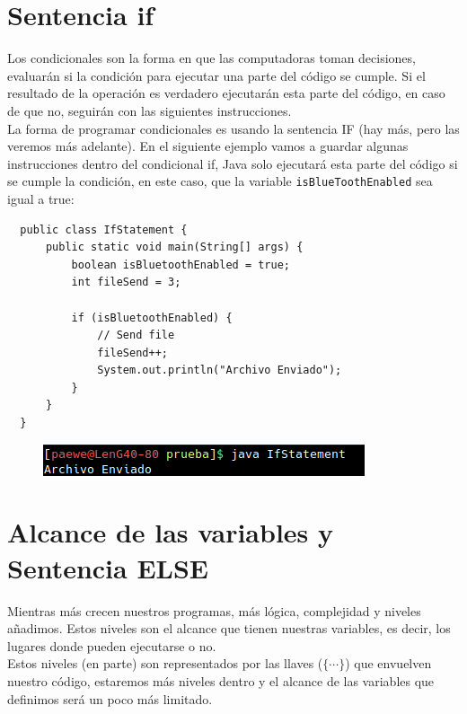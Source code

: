 \documentclass{article}
\begin{document}
\newpage

\section{Sentencia if}%
Los condicionales son la forma en que las computadoras toman decisiones,
evaluarán si la condición para ejecutar una parte del código se cumple. Si el
resultado de la operación es verdadero ejecutarán esta parte del código, en
caso de que no, seguirán con las siguientes instrucciones.\\

La forma de programar condicionales es usando la sentencia IF (hay más, pero
las veremos más adelante). En el siguiente ejemplo vamos a guardar algunas
instrucciones dentro del condicional if, Java solo ejecutará esta parte del
código si se cumple la condición, en este caso, que la variable
\texttt{isBlueToothEnabled} sea igual a true:


\begin{verbatim}
  public class IfStatement {
      public static void main(String[] args) {
          boolean isBluetoothEnabled = true;
          int fileSend = 3;

          if (isBluetoothEnabled) {
              // Send file
              fileSend++;
              System.out.println("Archivo Enviado");
          }
      }
  }
\end{verbatim}

\begin{figure}[h!]
  \centering
  \includegraphics[scale=0.75]{./Pictures/045_if_statement.png}
\end{figure}


\section{Alcance de las variables y Sentencia ELSE}%
Mientras más crecen nuestros programas, más lógica, complejidad y niveles
añadimos. Estos niveles son el alcance que tienen nuestras variables, es decir,
los lugares donde pueden ejecutarse o no.\\

Estos niveles (en parte) son representados por las llaves ($\{ \cdots \}$) que
envuelven nuestro código, estaremos más niveles dentro y el alcance de las
variables que definimos será un poco más limitado.\\
\end{document}
